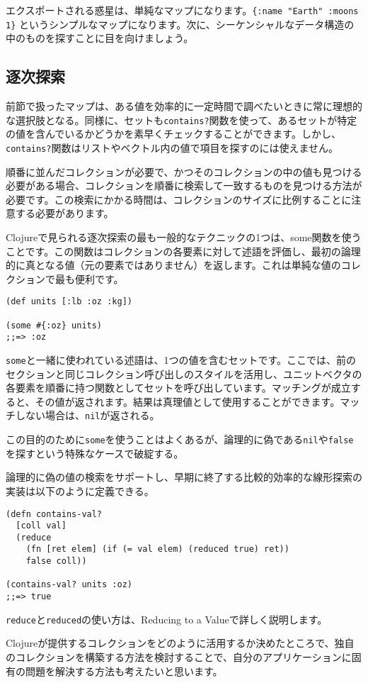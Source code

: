 エクスポートされる惑星は、単純なマップになります。\texttt{\{:name "Earth" :moons 1\}} というシンプルなマップになります。次に、シーケンシャルなデータ構造の中のものを探すことに目を向けましょう。

\subsection{逐次探索}

前節で扱ったマップは、ある値を効率的に一定時間で調べたいときに常に理想的な選択肢となる。同様に、セットも\texttt{contains?}関数を使って、あるセットが特定の値を含んでいるかどうかを素早くチェックすることができます。しかし、\texttt{contains?}関数はリストやベクトル内の値で項目を探すのには使えません。

順番に並んだコレクションが必要で、かつそのコレクションの中の値も見つける必要がある場合、コレクションを順番に検索して一致するものを見つける方法が必要です。この検索にかかる時間は、コレクションのサイズに比例することに注意する必要があります。

Clojureで見られる逐次探索の最も一般的なテクニックの1つは、some関数を使うことです。この関数はコレクションの各要素に対して述語を評価し、最初の論理的に真となる値（元の要素ではありません）を返します。これは単純な値のコレクションで最も便利です。

\begin{lstlisting}[numbers=none]
(def units [:lb :oz :kg])

(some #{:oz} units)
;;=> :oz
\end{lstlisting}

\texttt{some}と一緒に使われている述語は、1つの値を含むセットです。ここでは、前のセクションと同じコレクション呼び出しのスタイルを活用し、ユニットベクタの各要素を順番に持つ関数としてセットを呼び出しています。マッチングが成立すると、その値が返されます。結果は真理値として使用することができます。マッチしない場合は、\texttt{nil}が返される。

この目的のために\texttt{some}を使うことはよくあるが、論理的に偽である\texttt{nil}や\texttt{false}を探すという特殊なケースで破綻する。

論理的に偽の値の検索をサポートし、早期に終了する比較的効率的な線形探索の実装は以下のように定義できる。

\begin{lstlisting}[numbers=none]
(defn contains-val?
  [coll val]
  (reduce
    (fn [ret elem] (if (= val elem) (reduced true) ret))
    false coll))

(contains-val? units :oz)
;;=> true
\end{lstlisting}

\texttt{reduce}と\texttt{reduced}の使い方は、Reducing to a Valueで詳しく説明します。

Clojureが提供するコレクションをどのように活用するか決めたところで、独自のコレクションを構築する方法を検討することで、自分のアプリケーションに固有の問題を解決する方法も考えたいと思います。

